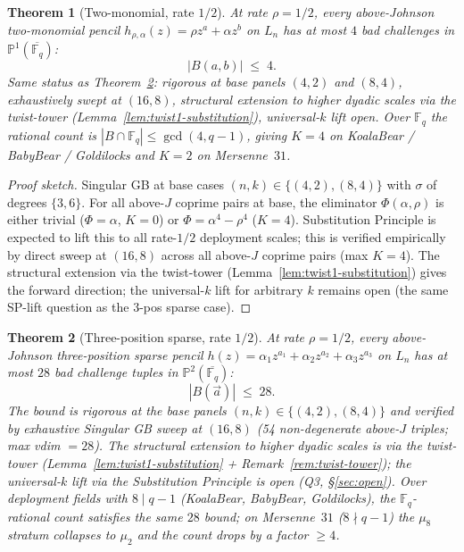 \documentclass[11pt]{article}
\newtheorem{theorem}{Theorem}[section]
\theoremstyle{definition}
\theoremstyle{remark}
\newcommand{\FF}{\mathbb{F}}
\begin{document}
\begin{theorem}[Two-monomial, rate $1/2$]
\label{thm:rate-half-K4}
At rate $\rho = 1/2$, every above-Johnson two-monomial pencil
$h_{\rho, \alpha}(z) = \rho z^a + \alpha z^b$ on $L_n$ has at most
$4$ bad challenges in $\mathbb P^1(\overline{\FF_q})$:
\[
 |B(a, b)| \;\leq\; 4.
\]
Same status as Theorem~\ref{thm:rate-half-K28}: rigorous at base
panels $(4, 2)$ and $(8, 4)$, exhaustively swept at $(16, 8)$,
structural extension to higher dyadic scales via the
twist-tower (Lemma~\ref{lem:twist1-substitution}), universal-$k$
lift open. Over $\FF_q$ the rational count is
$|B \cap \FF_q| \leq \gcd(4, q - 1)$, giving $K = 4$ on
KoalaBear / BabyBear / Goldilocks and $K = 2$ on Mersenne~$31$.
\end{theorem}

\begin{proof}[Proof sketch]
Singular GB at base cases $(n, k) \in \{(4, 2), (8, 4)\}$ with $\sigma$ of
degrees $\{3, 6\}$. For all above-$J$ coprime pairs at base, the
eliminator $\Phi(\alpha, \rho)$ is either trivial ($\Phi = \alpha$, $K = 0$)
or $\Phi = \alpha^4 - \rho^4$ ($K = 4$). Substitution Principle is
expected to lift this to all rate-$1/2$ deployment scales; this is
verified empirically by direct sweep at $(16, 8)$ across all
above-$J$ coprime pairs (max $K = 4$). The structural extension
via the twist-tower (Lemma~\ref{lem:twist1-substitution}) gives the
forward direction; the universal-$k$ lift for arbitrary $k$ remains
open (the same SP-lift question as the $3$-pos sparse case).
\end{proof}

\begin{theorem}[Three-position sparse, rate $1/2$]
\label{thm:rate-half-K28}
At rate $\rho = 1/2$, every above-Johnson three-position sparse
pencil $h(z) = \alpha_1 z^{a_1} + \alpha_2 z^{a_2} + \alpha_3 z^{a_3}$
on $L_n$ has at most $28$ bad challenge tuples in
$\mathbb P^2(\overline{\FF_q})$:
\[
 |B(\vec a)| \;\leq\; 28.
\]
The bound is rigorous at the base panels $(n, k) \in \{(4, 2),
(8, 4)\}$ and verified by exhaustive Singular GB sweep at
$(16, 8)$ (54 non-degenerate above-$J$ triples; max vdim $= 28$).
The structural extension to higher dyadic scales is via the
twist-tower (Lemma~\ref{lem:twist1-substitution} +
Remark~\ref{rem:twist-tower}); the universal-$k$ lift via the
Substitution Principle is open (Q3, \S\ref{sec:open}). Over deployment fields with $8 \mid q - 1$
(KoalaBear, BabyBear, Goldilocks), the $\FF_q$-rational count
satisfies the same $28$ bound; on Mersenne~$31$
($8 \nmid q - 1$) the $\mu_8$ stratum collapses to $\mu_2$ and the
count drops by a factor $\geq 4$.
\end{theorem}
\end{document}
